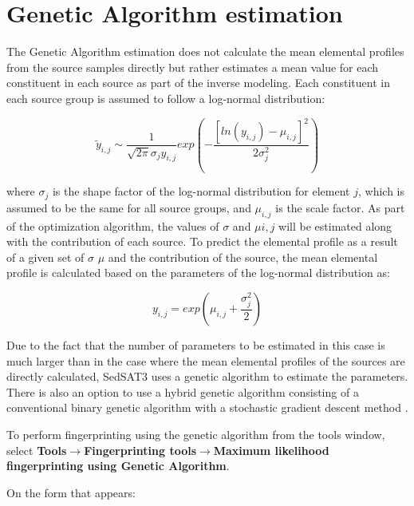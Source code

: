 \documentclass[12pt]{report}
\begin{document}
\section{Genetic Algorithm estimation}
The Genetic Algorithm estimation does not calculate the mean elemental profiles from the source samples directly but rather estimates a mean value for each constituent in each source as part of the inverse modeling. Each constituent in each source group is assumed to follow a log-normal distribution: 

\begin{equation}
    \tilde{y}_{i,j} \sim \frac{1}{\sqrt{2\pi}\sigma_j y_{i,j}}exp\left(-\frac{[ln(y_{i,j})-\mu_{i,j}]^2}{2\sigma_j^2}\right)
\end{equation}

where $\sigma_j$ is the shape factor of the log-normal distribution for element $j$, which is assumed to be the same for all source groups, and $\mu_{i,j}$ is the scale factor. As part of the optimization algorithm, the values of $\sigma$ and $\mu{i,j}$ will be estimated along with the contribution of each source. To predict the elemental profile as a result of a given set of $\sigma$ $\mu$ and the contribution of the source, the mean elemental profile is calculated based on the parameters of the log-normal distribution as: 

\begin{equation}
    y_{i,j} = exp\left(\mu_{i,j} + \frac{\sigma_j^2}{2}\right)
\end{equation}

Due to the fact that the number of parameters to be estimated in this case is much larger than in the case where the mean elemental profiles of the sources are directly calculated, SedSAT3 uses a genetic algorithm to estimate the parameters. There is also an option to use a hybrid genetic algorithm consisting of a conventional binary genetic algorithm with a stochastic gradient descent method \citep{alikhani2017evaluation}.

To perform fingerprinting using the genetic algorithm from the tools window, select \textbf{Tools}$\rightarrow$\textbf{Fingerprinting tools}$\rightarrow$\textbf{Maximum likelihood fingerprinting using Genetic Algorithm}. 

On the form that appears:
\end{document}

